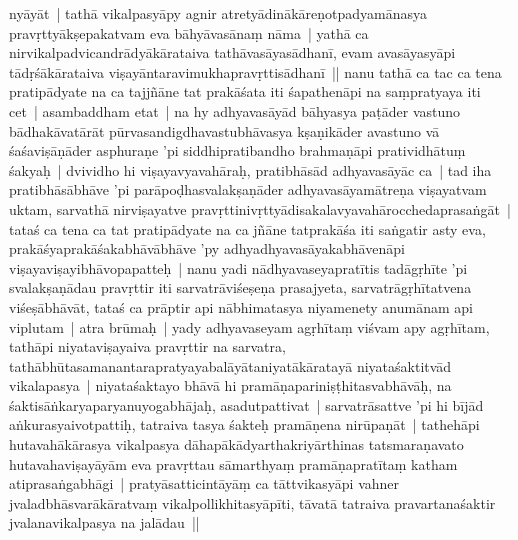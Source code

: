 \documentclass[article,12pt,a4paper]{memoir}%
\newcounter{parCount}
\begin{document}
	  \pstart \leavevmode%
	nyāyāt | tathā vikalpasyāpy agnir atretyādinākāreṇotpadyamānasya pravṛttyākṣepakatvam eva bāhyāvasānaṃ nāma | yathā ca nirvikalpadvicandrādyākārataiva tathāvasāyasādhanī, evam avasāyasyāpi tādṛśākārataiva viṣayāntaravimukhapravṛttisādhanī || \label{thakur75-137.25} nanu tathā ca tac ca tena pratipādyate na ca tajjñāne tat prakāśata iti śapathenāpi na saṃpratyaya iti cet | asambaddham etat | na hy adhyavasāyād bāhyasya paṭāder vastuno bādhakāvatārāt pūrvasandigdhavastubhāvasya kṣaṇikāder avastuno vā śaśaviṣāṇāder asphuraṇe 'pi siddhipratibandho brahmaṇāpi pratividhātuṃ śakyaḥ | dvividho hi viṣayavyavahāraḥ, pratibhāsād adhyavasāyāc ca | tad iha pratibhāsābhāve 'pi parāpoḍhasvalakṣaṇāder adhyavasāyamātreṇa viṣayatvam uktam, sarvathā nirviṣayatve pravṛttinivṛttyādisakalavyavahārocchedaprasaṅgāt | tataś ca tena ca tat pratipādyate na ca jñāne tatprakāśa iti saṅgatir asty eva, prakāśyaprakāśakabhāvābhāve 'py \label{ratnakīrtinibandhāvali__36r1PF7IMRXJYE54SUH8HG2DO14}adhya\label{ratnakīrtinibandhāvali__36r1PF7IMRVGV16KLF4NAL7T8DL}dhyavasāyakabhāvenāpi viṣayaviṣayibhāvopapatteḥ | \label{thakur75-138.1} nanu yadi nādhyavaseyapratītis tadāgṛhīte 'pi svalakṣaṇādau pravṛttir iti sarvatrāviśeṣeṇa prasajyeta, sarvatrāgṛhītatvena viśeṣābhāvāt, tataś ca prāptir api nābhimatasya niyamenety anumānam api viplutam | atra brūmaḥ | yady adhyavaseyam agṛhītaṃ viśvam apy agṛhītam, tathāpi niyataviṣayaiva pravṛttir na sarvatra, tathābhūtasamanantarapratyayabalāyātaniyatākāratayā niyataśaktitvād vikalapasya | niyataśaktayo bhāvā hi pramāṇapariniṣṭhitasvabhāvāḥ, na śaktisāṅkaryaparyanuyogabhājaḥ, asadutpattivat | sarvatrāsattve 'pi hi bījād aṅkurasyaivotpattiḥ, tatraiva tasya śakteḥ pramāṇena nirūpaṇāt | tathehāpi hutavahākārasya vikalpasya dāhapākādyarthakriyārthinas tatsmaraṇavato hutavahaviṣayāyām eva pravṛttau sāmarthyaṃ pramāṇapratītaṃ katham atiprasaṅgabhāgi | pratyāsatticintāyāṃ ca tāttvikasyāpi vahner jvaladbhāsvarākā\label{capv-np-13a-start}ratvaṃ vikalpollikhitasyāpīti, tāvatā tatraiva pravartanaśaktir jvalanavikalpasya na jalādau ||
	{}
	\pend%
      
\end{document}
